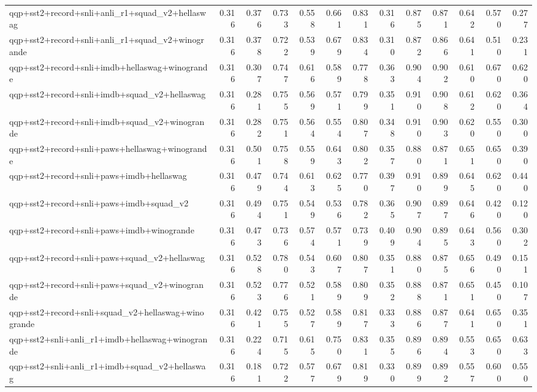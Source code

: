 \begin{table}[t]
\begin{tabular}{lrrrrrrrrrrrr}
    qqp+sst2+record+snli+anli\_r1+squad\_v2+hellaswag & 0.316 & 0.376 & 0.733 & 0.558 & 0.661 & 0.831 & 0.316 & 0.875 & 0.871 & 0.642 & 0.570 & 0.277 \\
    qqp+sst2+record+snli+anli\_r1+squad\_v2+winogrande & 0.316 & 0.378 & 0.722 & 0.539 & 0.679 & 0.834 & 0.310 & 0.872 & 0.866 & 0.641 & 0.510 & 0.231 \\
    qqp+sst2+record+snli+imdb+hellaswag+winogrande & 0.316 & 0.307 & 0.747 & 0.616 & 0.589 & 0.778 & 0.363 & 0.904 & 0.902 & 0.610 & 0.670 & 0.620 \\
    qqp+sst2+record+snli+imdb+squad\_v2+hellaswag & 0.316 & 0.281 & 0.755 & 0.569 & 0.571 & 0.799 & 0.351 & 0.910 & 0.908 & 0.612 & 0.620 & 0.364 \\
    qqp+sst2+record+snli+imdb+squad\_v2+winogrande & 0.316 & 0.282 & 0.751 & 0.564 & 0.554 & 0.807 & 0.348 & 0.910 & 0.903 & 0.620 & 0.550 & 0.300 \\
    qqp+sst2+record+snli+paws+hellaswag+winogrande & 0.316 & 0.501 & 0.758 & 0.559 & 0.643 & 0.802 & 0.357 & 0.880 & 0.871 & 0.651 & 0.650 & 0.390 \\
    qqp+sst2+record+snli+paws+imdb+hellaswag & 0.316 & 0.479 & 0.744 & 0.613 & 0.625 & 0.770 & 0.397 & 0.910 & 0.899 & 0.645 & 0.620 & 0.440 \\
    qqp+sst2+record+snli+paws+imdb+squad\_v2 & 0.316 & 0.494 & 0.751 & 0.549 & 0.536 & 0.782 & 0.365 & 0.907 & 0.897 & 0.646 & 0.420 & 0.120 \\
    qqp+sst2+record+snli+paws+imdb+winogrande & 0.316 & 0.473 & 0.736 & 0.574 & 0.571 & 0.739 & 0.409 & 0.904 & 0.895 & 0.643 & 0.560 & 0.302 \\
    qqp+sst2+record+snli+paws+squad\_v2+hellaswag & 0.316 & 0.528 & 0.780 & 0.543 & 0.607 & 0.807 & 0.351 & 0.880 & 0.875 & 0.656 & 0.490 & 0.151 \\
    qqp+sst2+record+snli+paws+squad\_v2+winogrande & 0.316 & 0.523 & 0.776 & 0.521 & 0.589 & 0.809 & 0.352 & 0.888 & 0.871 & 0.651 & 0.450 & 0.107 \\
    qqp+sst2+record+snli+squad\_v2+hellaswag+winogrande & 0.316 & 0.421 & 0.755 & 0.527 & 0.589 & 0.817 & 0.333 & 0.886 & 0.877 & 0.641 & 0.650 & 0.351 \\
    qqp+sst2+snli+anli\_r1+imdb+hellaswag+winogrande & 0.316 & 0.224 & 0.715 & 0.615 & 0.750 & 0.831 & 0.355 & 0.896 & 0.894 & 0.553 & 0.650 & 0.633 \\
    qqp+sst2+snli+anli\_r1+imdb+squad\_v2+hellaswag & 0.316 & 0.181 & 0.722 & 0.577 & 0.679 & 0.819 & 0.330 & 0.899 & 0.892 & 0.557 & 0.600 & 0.550 \\

\end{tabular}
\end{table}
